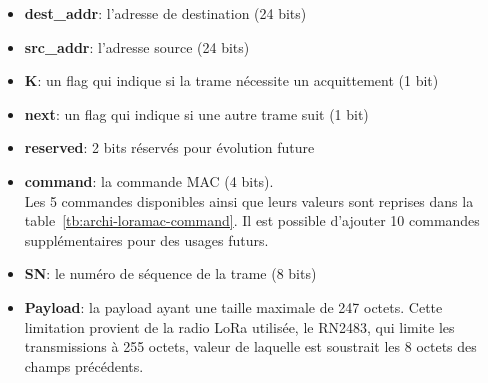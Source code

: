     \begin{itemize}
        \item \textbf{dest\_addr}: l'adresse de destination (24 bits)
        \item \textbf{src\_addr}: l'adresse source (24 bits)
        \item \textbf{K}: un flag  qui indique si la trame nécessite un acquittement (1 bit)
        \item \textbf{next}: un flag qui indique si une autre trame suit (1 bit)
        \item \textbf{reserved}: 2 bits réservés pour évolution future
        \item \textbf{command}: la commande MAC (4 bits).\\
        Les 5 commandes disponibles ainsi que leurs valeurs sont reprises dans la table~\ref{tb:archi-loramac-command}. Il est possible d'ajouter 10 commandes supplémentaires pour des usages futurs.
        \item \textbf{SN}: le numéro de séquence de la trame (8 bits)
        \item \textbf{Payload}: la payload ayant une taille maximale de 247 octets. Cette limitation provient de la radio LoRa utilisée, le RN2483, qui limite les transmissions à 255 octets, valeur de laquelle est soustrait les 8 octets des champs précédents.
        \begin{table}[H]
            \centering
            \caption{Description des commandes LoRaMAC.}
            \label{tb:archi-loramac-command}
        \end{table}
    \end{itemize}
